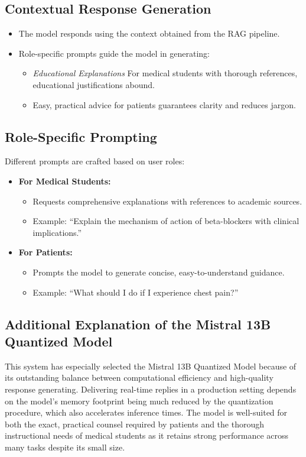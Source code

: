 \subsection{Contextual Response Generation}
\label{subsec:mistral_response}
\begin{itemize}
    \item The model responds using the context obtained from the RAG pipeline.
    \item Role-specific prompts guide the model in generating:
        \begin{itemize}
            \item \emph{Educational Explanations} For medical students with thorough references, educational justifications abound.
            \item Easy, practical advice for patients guarantees clarity and reduces jargon.
        \end{itemize}
\end{itemize}
\vspace{2cm}
\subsection{Role-Specific Prompting}
\label{subsec:mistral_prompting}
Different prompts are crafted based on user roles:
\begin{itemize}[itemsep=2em]
    \item \textbf{For Medical Students:}
        \begin{itemize}
            \item Requests comprehensive explanations with references to academic sources.
            \item Example: “Explain the mechanism of action of beta-blockers with clinical implications.”
        \end{itemize}
    \item \textbf{For Patients:}
        \begin{itemize}
            \item Prompts the model to generate concise, easy-to-understand guidance.
            \item Example: “What should I do if I experience chest pain?”
        \end{itemize}
\end{itemize}

\subsection{Additional Explanation of the Mistral 13B Quantized Model}
\label{subsec:mistral_explanation}
This system has especially selected the Mistral 13B Quantized Model because of its outstanding balance between computational efficiency and high-quality response generating.  Delivering real-time replies in a production setting depends on the model's memory footprint being much reduced by the quantization procedure, which also accelerates inference times.  The model is well-suited for both the exact, practical counsel required by patients and the thorough instructional needs of medical students as it retains strong performance across many tasks despite its small size.


